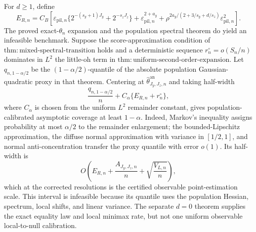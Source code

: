 For \(d\ge1\), define
\[
E_{R,n}=C_B\left[
\varepsilon_{\mathrm{pil},n}\{2^{-(s_y+1)J_y}+2^{-s_zJ_z}\}
+\varepsilon_{\mathrm{pil},n}^{2+a_y}
+\rho^{2a_y/(2+3/s_y+d/s_z)}\varepsilon_{\mathrm{pil},n}^2
\right].
\]
The proved exact-\(\theta_n\) expansion and the population spectral theorem do yield an infeasible benchmark. Suppose the score-approximation condition of \(\mathrm{thm{:}mixed\text{-}spectral\text{-}transition}\) holds and a deterministic sequence \(r_n^{\circ}=o(S_n/n)\) dominates in \(L^2\) the little-oh term in \(\mathrm{thm{:}uniform\text{-}second\text{-}order\text{-}expansion}\). Let \(q_{n,1-\alpha/2}\) be the \((1-\alpha/2)\)-quantile of the absolute population Gaussian-quadratic proxy in that theorem. Centering at \(\widehat\theta^{\mathrm{an}}_{J_y,J_z,n}\) and taking half-width
\[
\frac{q_{n,1-\alpha/2}}{n}+C_\alpha\{E_{R,n}+r_n^{\circ}\},
\]
where \(C_\alpha\) is chosen from the uniform \(L^2\) remainder constant, gives population-calibrated asymptotic coverage at least \(1-\alpha\). Indeed, Markov's inequality assigns probability at most \(\alpha/2\) to the remainder enlargement; the bounded-Lipschitz approximation, the diffuse normal approximation with variance in \([1/2,1]\), and normal anti-concentration transfer the proxy quantile with error \(o(1)\). Its half-width is
\[
O\!\left(E_{R,n}+\frac{A_{J_y,J_z,n}}n+\sqrt{\frac{V_{L,n}}n}\right),
\]
which at the corrected resolutions is the certified observable point-estimation scale. This interval is infeasible because its quantile uses the population Hessian, spectrum, local shifts, and linear variance. The separate \(d=0\) theorem supplies the exact equality law and local minimax rate, but not one uniform observable local-to-null calibration.
